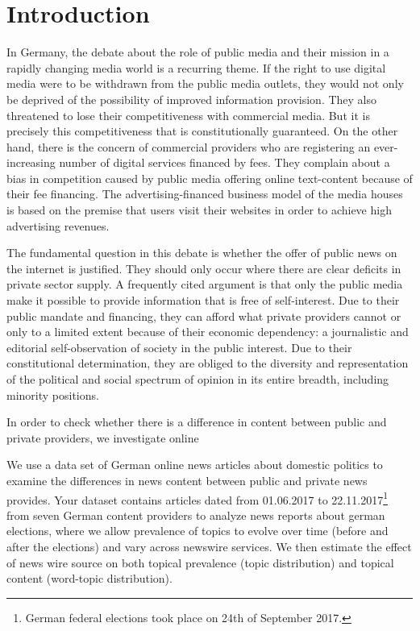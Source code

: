 \documentclass[12pt,a4paper,notitlepage]{article}
\begin{document}
\section{Introduction}

In Germany, the debate about the role of public media and their mission in a rapidly changing media world is a recurring theme. If the right to use digital media were to be withdrawn from the public media outlets, they would not only be deprived of the possibility of improved information provision. They also threatened to lose their competitiveness with commercial media. But it is precisely this competitiveness that is constitutionally guaranteed. On the other hand, there is the concern of commercial providers who are registering an ever-increasing number of digital services financed by fees. They complain about a bias in competition caused by public media offering online text-content because of their fee financing. The advertising-financed business model of the media houses is based on the premise that users visit their websites in order to achieve high advertising revenues.

The fundamental question in this debate is whether the offer of public news on the internet is justified. They should only occur where there are clear deficits in private sector supply. A frequently cited argument is that only the public media make it possible to provide information that is free of self-interest. Due to their public mandate and financing, they can afford what private providers cannot or only to a limited extent because of their economic dependency: a journalistic and editorial self-observation of society in the public interest. Due to their constitutional determination, they are obliged to the diversity and representation of the political and social spectrum of opinion in its entire breadth, including minority positions.

In order to check whether there is a difference in content between public and private providers, we investigate online

We use a data set of German online news articles about domestic politics to examine the differences in news content between public and private news provides. Your dataset contains articles dated from 01.06.2017 to 22.11.2017\footnote{German federal elections took place on 24th of September 2017.} from seven German content providers to analyze news reports about german elections, where we allow prevalence of topics to evolve over time (before and after the elections) and vary across newswire services. We then estimate the effect of news wire source on both topical prevalence (topic distribution) and topical content (word-topic distribution). 
\end{document}
